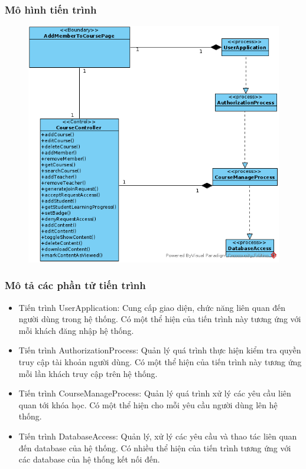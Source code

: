 \documentclass[./../main_file.tex]{subfiles}
\begin{document}
\subsubsection{Mô hình tiến trình}

\begin{figure}[H]
	\centering
	\includegraphics[width=\linewidth]{./images/pv_add_course_member.png}
\end{figure}

\subsubsection{Mô tả các phần tử tiến trình}
\begin{itemize}
	\item Tiến trình UserApplication: Cung cấp giao diện, chức năng liên quan đến người dùng trong hệ thống. Có một thể hiện của tiến trình này tương ứng với mỗi khách đăng nhập hệ thống.
	\item Tiến trình AuthorizationProcess: Quản lý quá trình thực hiện kiểm tra quyền truy cập tài khoản người dùng.
	Có một thể hiện của tiến trình này tương ứng mỗi lần khách truy cập trên hệ thống.
\item Tiến trình CourseManageProcess: Quản lý quá trình xử lý các yêu cầu liên quan tới khóa học.
	Có một thể hiện cho mỗi yêu cầu người dùng lên hệ thống.
	\item Tiến trình DatabaseAccess: Quản lý, xử lý các yêu cầu và thao tác liên quan đến database của hệ thống. Có nhiều thể hiện của tiến trình tương ứng với các database của hệ thống kết nối đến.
\end{itemize}
\end{document}
